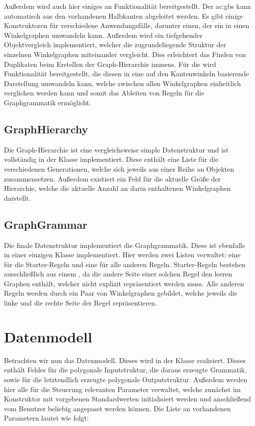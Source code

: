 Außerdem wird auch hier einiges an Funktionalität bereitgestellt. Der \gls{ac:gbs} kann automatisch aus den vorhandenen Halbkanten
abgeleitet werden. Es gibt einige Konstruktoren für verschiedene Anwendungsfälle, darunter einen, der ein  in
einen Winkelgraphen umwandeln kann. Außerdem wird ein tiefgehender Objektvergleich implementiert, welcher die zugrundeliegende Struktur
der einzelnen Winkelgraphen miteinander vergleicht. Dies erleichtert das Finden von Duplikaten beim Erstellen der
Graph-Hierarchie immens. Für die  wird Funktionalität bereitgestellt, die diesen in eine auf den
Kantenwinkeln basierende Darstellung umwandeln kann, welche zwischen allen Winkelgraphen einheitlich verglichen werden kann und somit
das Ableiten von Regeln für die Graphgrammatik ermöglicht.

\subsection{GraphHierarchy}
Die Graph-Hierarchie ist eine vergleichsweise simple Datenstruktur und ist vollständig in der Klasse  implementiert.
Diese enthält eine Liste für die verschiedenen Generationen, welche sich jeweils aus einer Reihe an  Objekten
zusammensetzen. Außerdem existiert ein Feld für die aktuelle Größe der Hierarchie, welche die aktuelle Anzahl an darin enthaltenen
Winkelgraphen darstellt.

\subsection{GraphGrammar}
Die finale Datenstruktur implementiert die Graphgrammatik. Diese ist ebenfalls in einer einzigen Klasse  implementiert.
Hier werden zwei Listen verwaltet: eine für die Starter-Regeln und eine für alle anderen Regeln. Starter-Regeln bestehen ausschließlich
aus einem , da die andere Seite einer solchen Regel den leeren Graphen enthält, welcher nicht explizit repräsentiert
werden muss. Alle anderen Regeln werden durch ein Paar von Winkelgraphen gebildet, welche jeweils die linke und die rechte Seite der
Regel repräsentieren.

\section{Datenmodell}
Betrachten wir nun das Datenmodell. Dieses wird in der Klasse  realisiert. Dieses enthält Felder für die polygonale
Inputstruktur, die daraus erzeugte Grammatik, sowie für die letztendlich erzeugte polygonale Outputstruktur. Außerdem werden hier alle
für die Steuerung relevanten Parameter verwaltet, welche zunächst im Konstruktor mit vorgebenen Standardwerten initialisiert werden und
anschließend vom Benutzer beliebig angepasst werden können. Die Liste an vorhandenen Parametern lautet wie folgt:

